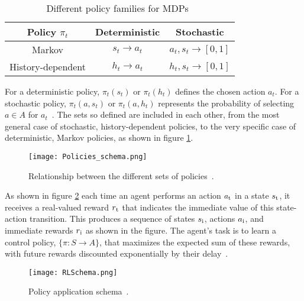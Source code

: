 \begin{table}[h!]
\centering
\begin{tabular}{|c|c|c|}
	\hline \textbf{Policy $\pi_t$}
	&\textbf{Deterministic} & \textbf{Stochastic}  \\ 
	\hline
	\hline Markov 
	&$s_t \rightarrow a_t$  &$a_t, s_t \rightarrow [0, 1]$ \\ 
	 \hline History-dependent
	&$h_t \rightarrow a_t$  &$h_t, s_t \rightarrow [0,1]$  \\ 
	\hline
\end{tabular}
\caption{Different policy families for MDPs~\cite{Sigaud:2010:MDP:1841781}}
\label{table:T1}
\end{table} 

For a deterministic policy, $\pi_t (s_t)$ or $\pi_t (h_t)$ defines the chosen action $a_t$. For a stochastic policy, $\pi_t (a, s_t)$ or $\pi_t (a, h_t)$ represents the probability of selecting $a \in A$ for $a_t$~\cite{Sigaud:2010:MDP:1841781}. The sets so defined are included in each other, from the most general case of stochastic, history-dependent policies, to the very specific case of deterministic, Markov policies, as shown in figure \ref{fig:Policies_schema}.

\begin{figure}[h!]
	\centering
	\texttt{[image: Policies\_schema.png]}
	\caption{Relationship between the different sets of policies~\cite{Sigaud:2010:MDP:1841781}.}
	\label{fig:Policies_schema}
\end{figure}

As shown in figure \ref{fig:Policy_application_schema} each time an agent performs an action $a\textsubscript{t}$ in a state $s\textsubscript{t}$, it receives a real-valued reward $r\textsubscript{t}$ that indicates the immediate value of this state-action transition. This produces a sequence of states $s\textsubscript{i}$, actions $a\textsubscript{i}$, and immediate rewards $r\textsubscript{i}$ as shown in the figure. The agent's task is to learn a control policy, $\{\pi : S \longrightarrow A\}$, that maximizes the expected sum of these rewards, with future rewards discounted exponentially by their delay~\cite{Mitchell}.

\begin{figure}[h!]
	\centering
	\texttt{[image: RLSchema.png]}
	\caption{Policy application schema~\cite{SuttonBarto}.}
	\label{fig:Policy_application_schema}
\end{figure}
 
